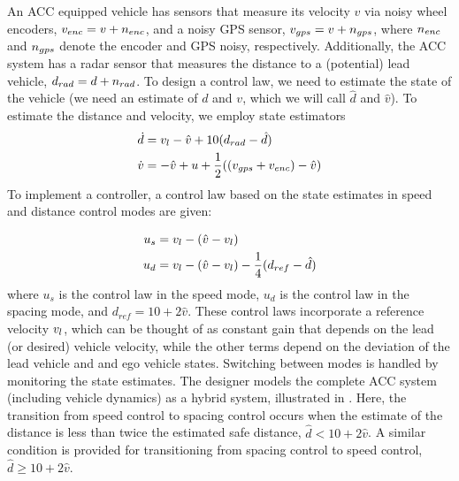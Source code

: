 An ACC equipped vehicle has sensors that measure its velocity $v$ via noisy wheel encoders, $v_{enc} = v + n_{enc}$, and a noisy GPS sensor, $v_{gps} = v+n_{gps}$, where $n_{enc}$ and $n_{gps}$ denote the encoder and GPS noisy, respectively. 
%
%
Additionally, the ACC system has a radar sensor that measures the distance to a (potential) lead vehicle, $d_{rad} = d+n_{rad}$. 
%
To design a control law, we need to estimate the state of the vehicle (\ie we need an estimate of $d$ and $v$, which we will call $\hat{d}$ and $\hat{v}$). To estimate the distance and velocity, we employ state estimators
%
\begin{align}
\dot{d} & = v_{l} - \hat{v} + 10(d_{rad} - \hat{d}) \nonumber \\
\dot{v} & = -\hat{v} + u +  \frac{1}{2} ((v_{gps} + v_{enc}) - \hat{v}) \nonumber
\end{align}
%
%
To implement a controller, a control law based on the state estimates in speed and distance control modes are given: 

\begin{align}
u_s & = v_{l} - (\hat{v}-v_{l}) \nonumber \\
u_d & = v_{l} - (\hat{v}-v_{l}) - \frac{1}{4} (d_{ref} - \hat{d}) \nonumber
\end{align}
%
%
where $u_s$ is the control law in the speed mode, $u_d$ is the control law in the spacing mode, and $d_{ref} = 10 + 2\hat{v}$. These control laws incorporate a reference velocity $v_{l}$, which can be thought of as constant gain that depends on the lead (or desired) vehicle velocity, while the other terms depend on the deviation of the lead vehicle and and ego vehicle states. Switching between modes is handled by monitoring the state estimates. The designer models the complete ACC system (including vehicle dynamics) as a hybrid system, illustrated in . Here, the transition from speed control to spacing control occurs when the estimate of the distance is less than twice the estimated safe distance, \ie $\hat{d} < 10 + 2\hat{v}$. A similar condition is provided for transitioning from spacing control to speed control, \ie $\hat{d} \geq 10 + 2\hat{v}$. 
%
%

